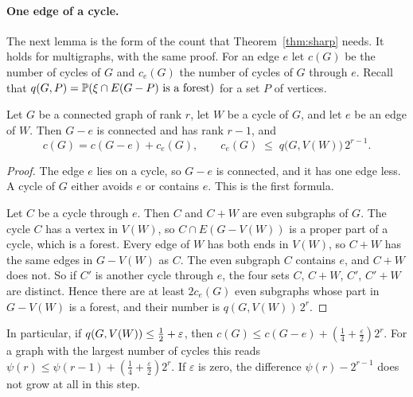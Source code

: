 
\paragraph{One edge of a cycle.}
The next lemma is the form of the count that Theorem~\ref{thm:sharp} needs. It holds for
multigraphs, with the same proof. For an edge $e$ let $c(G)$ be the number of cycles of $G$ and
$c_e(G)$ the number of cycles of $G$ through $e$. Recall that
$q(G,P)=\mathbb{P}(\xi\cap E(G-P)\text{ is a forest})$ for a set $P$ of vertices.

\begin{lemma}\label{lem:edge}
Let $G$ be a connected graph of rank $r$, let $W$ be a cycle of $G$, and let $e$ be an edge of $W$.
Then $G-e$ is connected and has rank $r-1$, and
\[
  c(G)=c(G-e)+c_e(G),\qquad c_e(G)\;\le\;q\bigl(G,V(W)\bigr)\,2^{r-1}.
\]
\end{lemma}

\begin{proof}
The edge $e$ lies on a cycle, so $G-e$ is connected, and it has one edge less. A cycle of $G$ either
avoids $e$ or contains $e$. This is the first formula.

Let $C$ be a cycle through $e$. Then $C$ and $C+W$ are even subgraphs of $G$. The cycle $C$ has a
vertex in $V(W)$, so $C\cap E(G-V(W))$ is a proper part of a cycle, which is a forest. Every edge of
$W$ has both ends in $V(W)$, so $C+W$ has the same edges in $G-V(W)$ as $C$. The even subgraph $C$
contains $e$, and $C+W$ does not. So if $C'$ is another cycle through $e$, the four sets $C$,
$C+W$, $C'$, $C'+W$ are distinct. Hence there are at least $2c_e(G)$ even subgraphs whose part in
$G-V(W)$ is a forest, and their number is $q(G,V(W))\,2^{r}$.
\end{proof}

In particular, if $q(G,V(W))\le\tfrac12+\varepsilon$, then
$c(G)\le c(G-e)+(\frac14+\frac\varepsilon2)2^{r}$. For a graph with the largest number of cycles
this reads $\psi(r)\le\psi(r-1)+(\frac14+\frac\varepsilon2)2^{r}$. If $\varepsilon$ is zero, the
difference $\psi(r)-2^{r-1}$ does not grow at all in this step.
